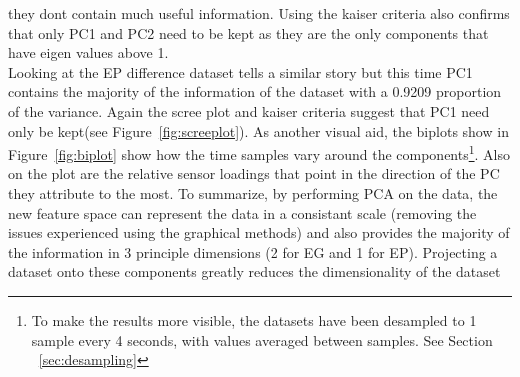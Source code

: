 \documentclass[twocolumn]{article}
\begin{document}
they dont contain much useful information. Using the kaiser criteria also confirms that only PC1 and PC2 need to be kept as they are
the only components that have eigen values above 1. \\
Looking at the EP difference dataset tells a similar story but this time PC1 contains the majority of the information of the dataset with
a 0.9209 proportion of the variance. Again the scree plot and kaiser criteria suggest that PC1 need only be kept(see Figure~\ref{fig:screeplot}). 
As another visual aid, the biplots show in Figure~\ref{fig:biplot} show how the time samples vary around the components\footnote{To make the results
more visible, the datasets have been desampled to 1 sample every 4 seconds, with values averaged between samples. See Section ~\ref{sec:desampling}}. Also on the plot
are the relative sensor loadings that point in the direction of the PC they attribute to the most. To summarize, by performing PCA on the data, 
the new feature space can represent the data in a consistant scale (removing the issues experienced using the graphical methods) and also provides 
the majority of the information in 3 principle dimensions (2 for EG and 1 for EP). Projecting a dataset onto these components greatly reduces
the dimensionality of the dataset 
\end{document}
